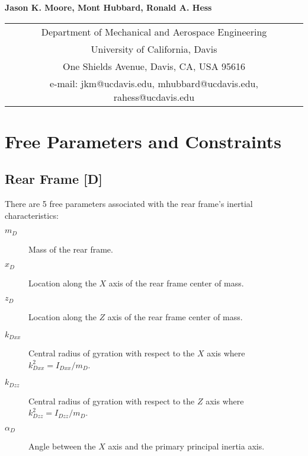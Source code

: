 \documentclass{article}
\begin{document}
\begin{center}
\end{center}

\begin{center}
  \normalsize{\bf{Jason K. Moore, Mont Hubbard,  Ronald A. Hess}}
\end{center}

\begin{center}
  \begin{tabular}{c}
    Department of Mechanical and Aerospace Engineering\\
    University of California, Davis\\
    One Shields Avenue, Davis, CA, USA 95616\\
    e-mail: jkm@ucdavis.edu, mhubbard@ucdavis.edu, rahess@ucdavis.edu\\
  \end{tabular}
\end{center}

\appendix

\section{Free Parameters and Constraints}

\subsection{Rear Frame [D]}

There are 5 free parameters associated with the rear frame's inertial
characteristics:

\begin{description}
  \item[$m_D$] Mass of the rear frame.
  \item[$x_D$] Location along the $X$ axis of the rear frame center of mass.
  \item[$z_D$] Location along the $Z$ axis of the rear frame center of mass.
  \item[$k_{Dxx}$] Central radius of gyration with respect to the $X$ axis
    where $k_{Dxx}^2=I_{Dxx} / m_D$.
  \item[$k_{Dzz}$] Central radius of gyration with respect to the $Z$ axis
    where $k_{Dzz}^2=I_{Dzz} / m_D$.
  \item[$\alpha_D$] Angle between the $X$ axis and the primary principal
    inertia axis.
\end{description}
\end{document}
